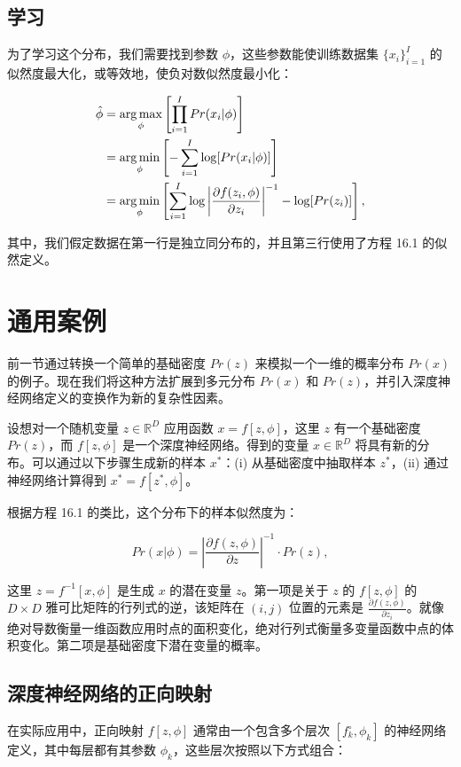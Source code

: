 \documentclass[lang=cn,newtx,10pt,scheme=chinese]{elegantbook}
\begin{document}
\subsection{学习}

为了学习这个分布，我们需要找到参数 \(\phi\)，这些参数能使训练数据集 \(\{x_i\}_{i=1}^I\) 的似然度最大化，或等效地，使负对数似然度最小化：


\begin{align}
\hat{\phi} &= \underset{\phi}{\arg\max} \left[ \prod_{i=1}^I Pr(x_i|\phi) \right] \notag \\
&= \underset{\phi}{\arg\min} \left[ -\sum_{i=1}^I \log[Pr(x_i|\phi)] \right] \notag \\
&= \underset{\phi}{\arg\min} \left[ \sum_{i=1}^I \log \left| \frac{\partial f(z_i, \phi)}{\partial z_i} \right|^{-1} - \log[Pr(z_i)] \right], 
\end{align} 


其中，我们假定数据在第一行是独立同分布的，并且第三行使用了方程 16.1 的似然定义。


\section{通用案例}
前一节通过转换一个简单的基础密度 \(Pr(z)\) 来模拟一个一维的概率分布 \(Pr(x)\) 的例子。现在我们将这种方法扩展到多元分布 \(Pr(x)\) 和 \(Pr(z)\)，并引入深度神经网络定义的变换作为新的复杂性因素。

设想对一个随机变量 \(z \in \mathbb{R}^D\) 应用函数 \(x = f[z, \phi]\)，这里 \(z\) 有一个基础密度 \(Pr(z)\)，而 \(f[z, \phi]\) 是一个深度神经网络。得到的变量 \(x \in \mathbb{R}^D\) 将具有新的分布。可以通过以下步骤生成新的样本 \(x^*\)：(i) 从基础密度中抽取样本 \(z^*\)，(ii) 通过神经网络计算得到 \(x^* = f[z^*, \phi]\)。

根据方程 16.1 的类比，这个分布下的样本似然度为：

\begin{equation}
Pr(x|\phi) = \left| \frac{\partial f(z, \phi)}{\partial z} \right|^{-1} \cdot Pr(z), 
\end{equation}

这里 \(z = f^{-1}[x, \phi]\) 是生成 \(x\) 的潜在变量 \(z\)。第一项是关于 \(z\) 的 \(f[z, \phi]\) 的 \(D \times D\) 雅可比矩阵的行列式的逆，该矩阵在 \((i, j)\) 位置的元素是 \(\frac{\partial f(z, \phi)}{\partial z_i}\)。就像绝对导数衡量一维函数应用时点的面积变化，绝对行列式衡量多变量函数中点的体积变化。第二项是基础密度下潜在变量的概率。

\subsection{深度神经网络的正向映射}
在实际应用中，正向映射 \(f[z, \phi]\) 通常由一个包含多个层次 \([f_k^{\circ}, \phi_k]\) 的神经网络定义，其中每层都有其参数 \(\phi_k\)，这些层次按照以下方式组合：
\end{document}
